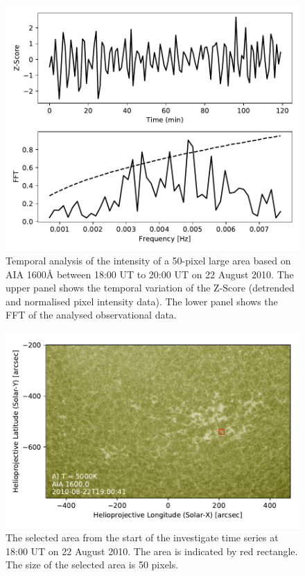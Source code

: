 \documentclass[linenumbers]{aastex63}
\begin{document}
\begin{figure}

    \centering
    \label{fft_sim}
    \includegraphics[scale=0.55]{AIA1600_AR_50px.pdf}
    \caption{Temporal analysis of the intensity of a 50-pixel large area based on AIA 1600{\AA} between 18:00 UT to 20:00 UT on 22 August 2010. The upper panel shows the temporal variation of the Z-Score (detrended and normalised pixel intensity data). The lower panel shows the FFT of the analysed observational data. }
\end{figure}

\begin{figure}
    \label{obs}
    \centering
    \includegraphics[scale=0.5]{obs_data.pdf}
    \caption{ The selected area from the start of the investigate time series at 18:00 UT on 22 August 2010. The area is indicated by red rectangle. The size of the selected area is 50 pixels.}
\end{figure}
\end{document}
